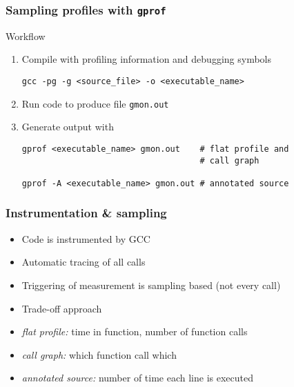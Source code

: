 \documentclass[dvipsnames,presentation,aspectratio=169,14pt]{beamer}
\begin{document}
\begin{frame}[fragile]
  \frametitle{Sampling profiles with \texttt{gprof}}
  \begin{exampleblock}{Workflow}
    \begin{enumerate}[leftmargin=18pt, itemsep=10pt]
    \item Compile with profiling information and debugging symbols
\begin{verbatim}
gcc -pg -g <source_file> -o <executable_name>
\end{verbatim}
    \item Run code to produce file \texttt{gmon.out}
    \item Generate output with
\begin{verbatim}
gprof <executable_name> gmon.out    # flat profile and
                                    # call graph

gprof -A <executable_name> gmon.out # annotated source
\end{verbatim}
    \end{enumerate}
  \end{exampleblock}
\end{frame}

\begin{frame}
  \frametitle{Instrumentation \& sampling}
  \begin{itemize}[itemsep=5pt]
  \item Code is instrumented by GCC
  \item Automatic tracing of all calls
  \item Triggering of measurement is sampling based (not every call)
  \item Trade-off approach
  \end{itemize}
  \vskip 5pt

  \begin{itemize}
  \item \emph{flat profile:} time in function, number of function calls
  \item \emph{call graph:} which function call which
  \item \emph{annotated source:} number of time each line is executed
  \end{itemize}

\end{frame}
\end{document}
